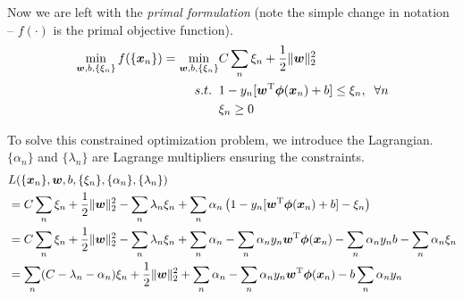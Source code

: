 \documentclass[11pt]{article}
\newcommand{\vct}[1]{\boldsymbol{#1}} %
\newcommand{\T}{^{\textrm T}} %
\begin{document}
 Now we are left with the {\it primal formulation} (note the simple change in notation -- $f(\cdot)$ is the primal objective function).
\begin{align*}
\min_{\vct{w}, b, \{\xi_{n}\}} f(\{\vct{x}_{n}\}) =
\min_{\vct{w}, b, \{\xi_{n}\}} & C \sum_{n} \xi_{n} + \frac{1}{2}\|\vct{w}\|_{2}^{2}\\
s.t. \;\; &1 - y_{n}[\vct{w}\T \vct{\phi}(\vct{x}_{n}) + b] \le \xi_{n}, \; \;\forall n \\
&\xi_{n} \ge 0
\end{align*}

To solve this constrained optimization problem, we introduce the Lagrangian. $\{\alpha_{n}\}$ and $\{\lambda_{n}\}$ are Lagrange multipliers ensuring the constraints.
\begin{align*}
&L(\{\vct{x}_{n}\}, \vct{w}, b, \{\xi_{n}\}, \{\alpha_{n}\}, \{\lambda_{n}\}) \\&= C \sum_{n} \xi_{n} + \frac{1}{2}\|\vct{w}\|_{2}^{2} - \sum_{n} \lambda_{n} \xi_{n} + \sum_{n} \alpha_{n} \left(1 - y_{n}[\vct{w}\T \vct{\phi}(\vct{x}_{n}) + b] - \xi_{n} \right)\\
&= C \sum_{n} \xi_{n} + \frac{1}{2}\|\vct{w}\|_{2}^{2} - \sum_{n} \lambda_{n} \xi_{n} + \sum_{n} \alpha_{n}  - \sum_{n} \alpha_{n} y_{n}\vct{w}\T \vct{\phi}(\vct{x}_{n}) - \sum_{n} \alpha_{n} y_{n} b - \sum_{n} \alpha_{n} \xi_{n}\\
&= \sum_{n} (C - \lambda_{n} - \alpha_{n}) \xi_{n} + \frac{1}{2}\|\vct{w}\|_{2}^{2}  + \sum_{n} \alpha_{n}  - \sum_{n} \alpha_{n} y_{n}\vct{w}\T \vct{\phi}(\vct{x}_{n}) - b\sum_{n} \alpha_{n} y_{n}
\end{align*}
\end{document}
